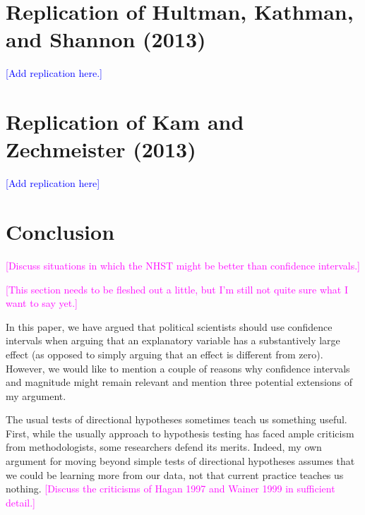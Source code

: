 \documentclass[12pt]{article}
\newcommand{\kelly}[1]{\textcolor{blue}{#1}}
\newcommand{\carlisle}[1]{\textcolor{magenta}{#1}}
\begin{document}


\section*{Replication of Hultman, Kathman, and Shannon (2013)}

\kelly{[Add replication here.]}

\section*{Replication of Kam and Zechmeister (2013)}

\kelly{[Add replication here]}

\section*{Conclusion}

\carlisle{[Discuss situations in which the NHST might be better than confidence intervals.]}


\carlisle{[This section needs to be fleshed out a little, but I'm still not quite sure what I want to say yet.]}


In this paper, we have argued that political scientists should use confidence intervals when arguing that an explanatory variable has a substantively large effect (as opposed to simply arguing that an effect is different from zero). However, we would like to mention a couple of reasons why confidence intervals and magnitude might remain relevant and mention three potential extensions of my argument.

The usual tests of directional hypotheses sometimes teach us something useful. First, while the usually approach to hypothesis testing has faced ample criticism from methodologists, some researchers defend its merits. Indeed, my own argument for moving beyond simple tests of directional hypotheses assumes that we could be learning more from our data, not that current practice teaches us nothing. \carlisle{[Discuss the criticisms of Hagan 1997 and Wainer 1999 in sufficient detail.]}
\end{document}
